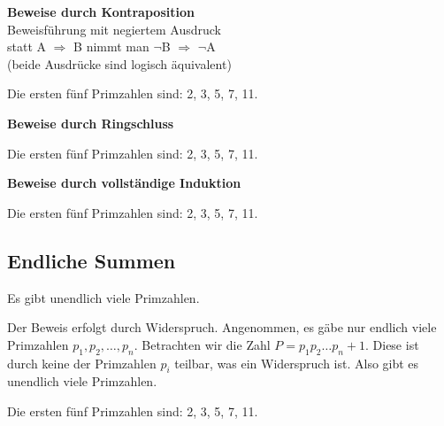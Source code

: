 \begin{definitionbox}
\textbf{Beweise durch Kontraposition}\\
Beweisführung mit negiertem Ausdruck\\
statt A $\Rightarrow$ B nimmt man $\neg$B $\Rightarrow$ $\neg$A\\
(beide Ausdrücke sind logisch äquivalent)
\end{definitionbox}
\begin{beispielbox}
Die ersten fünf Primzahlen sind: 2, 3, 5, 7, 11.
\end{beispielbox}

\begin{definitionbox}
\textbf{Beweise durch Ringschluss}\\

\end{definitionbox}
\begin{beispielbox}
Die ersten fünf Primzahlen sind: 2, 3, 5, 7, 11.
\end{beispielbox}

\begin{definitionbox}
\textbf{Beweise durch vollständige Induktion}\\
\end{definitionbox}
\begin{beispielbox}
Die ersten fünf Primzahlen sind: 2, 3, 5, 7, 11.
\end{beispielbox}



\subsection{Endliche Summen}


\begin{satzbox}
Es gibt unendlich viele Primzahlen.
\end{satzbox}

\begin{beweisbox}
Der Beweis erfolgt durch Widerspruch. Angenommen, es gäbe nur endlich viele Primzahlen \( p_1, p_2, \dots, p_n \). Betrachten wir die Zahl \( P = p_1 p_2 \dots p_n + 1 \). Diese ist durch keine der Primzahlen \( p_i \) teilbar, was ein Widerspruch ist. Also gibt es unendlich viele Primzahlen.
\end{beweisbox}

\begin{beispielbox}
Die ersten fünf Primzahlen sind: 2, 3, 5, 7, 11.
\end{beispielbox}